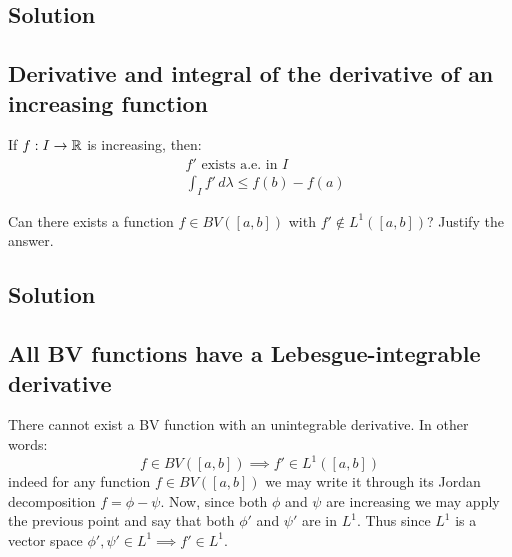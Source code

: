 \subsection*{Solution}

\subsection[]{Derivative and integral of the derivative of an increasing function}
If $f:I\to\mathbb{R}$ is increasing, then:
\begin{align*}
    & f' \text{ exists a.e. in } I \\
    & \int_I f' \, d\lambda \leq f(b)-f(a)
\end{align*}


\question
Can there exists a function $f \in BV ([a, b])$ with $f'\not\in L^1([a, b])$? Justify the answer.

\subsection*{Solution}

\subsection{All BV functions have a Lebesgue-integrable derivative}
There cannot exist a BV function with an unintegrable derivative. In other words:
\[
    f \in BV([a,b]) \implies f' \in L^1([a,b])
\]
indeed for any function $f\in BV([a,b])$ we may write it through its Jordan decomposition $f=\phi-\psi$. Now, since both $\phi$ and $\psi$ are increasing we may apply the previous point and say that both $\phi'$ and $\psi'$ are in $L^1$. Thus since $L^1$ is a vector space $\phi',\psi'\in L^1 \implies f'\in L^1$.
